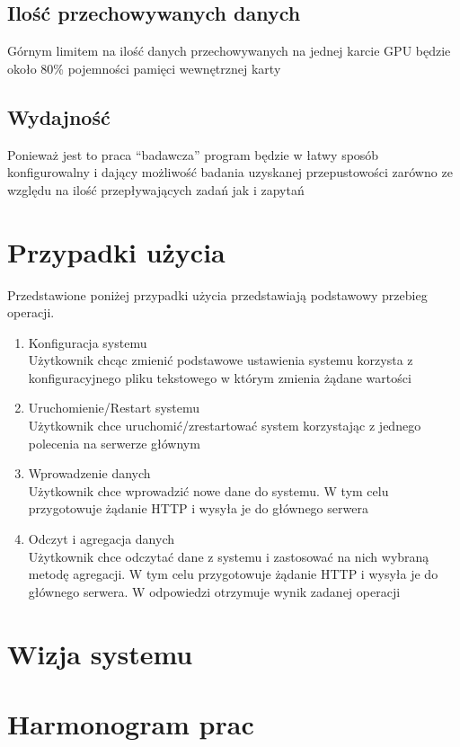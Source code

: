 \documentclass[paper=a4, fontsize=11pt]{scrartcl} %
\numberwithin{equation}{section} %
\numberwithin{figure}{section} %
\numberwithin{table}{section} %
\begin{document}
    \subsection{Ilość przechowywanych danych}
    Górnym limitem na ilość danych przechowywanych na jednej karcie GPU będzie około 80\% pojemności pamięci wewnętrznej karty
    \subsection{Wydajność}
    Ponieważ jest to praca ``badawcza'' program będzie w łatwy sposób konfigurowalny i dający możliwość badania uzyskanej
     przepustowości zarówno ze względu na ilość przepływających zadań jak i zapytań
\section{Przypadki użycia}
    Przedstawione poniżej przypadki użycia przedstawiają podstawowy przebieg operacji.
    \begin{enumerate}
        \item Konfiguracja systemu
        \\Użytkownik chcąc zmienić podstawowe ustawienia systemu korzysta z konfiguracyjnego pliku tekstowego w którym
        zmienia żądane wartości
        \item Uruchomienie/Restart systemu
        \\Użytkownik chce uruchomić/zrestartować system korzystając z jednego polecenia na serwerze głównym
        \item Wprowadzenie danych
        \\Użytkownik chce wprowadzić nowe dane do systemu. W tym celu przygotowuje żądanie HTTP i wysyła je do
        głównego serwera
        \item Odczyt i agregacja danych
        \\Użytkownik chce odczytać dane z systemu i zastosować na nich wybraną metodę agregacji. W tym celu przygotowuje
        żądanie HTTP i wysyła je do głównego serwera. W odpowiedzi otrzymuje wynik zadanej operacji

    \end{enumerate}

\section{Wizja systemu}

\section{Harmonogram prac}
\end{document}
